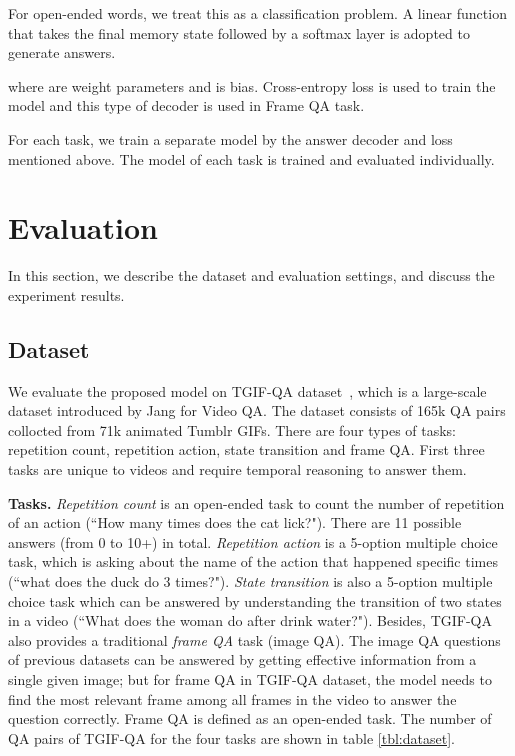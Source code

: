 \documentclass[10pt,twocolumn,letterpaper]{article}
\begin{document}
For open-ended words, we treat this as a classification problem. A linear function that takes the final memory state  followed by a softmax layer is adopted to generate answers.

where  are weight parameters and  is bias. Cross-entropy loss is used to train the model and this type of decoder is used in Frame QA task.

For each task, we train a separate model by the answer decoder and loss mentioned above. The model of each task is trained and evaluated individually.

\section{Evaluation}
\label{sec:eval}
In this section, we describe the dataset and evaluation settings, and discuss the experiment results.

\subsection{Dataset}
We evaluate the proposed model on TGIF-QA dataset~\cite{Jang_2017_CVPR}, which is a large-scale dataset introduced by Jang \etal for Video QA. The dataset consists of 165k QA pairs collocted from 71k animated Tumblr GIFs. There are four types of tasks: repetition count, repetition action, state transition and frame QA. First three tasks are unique to videos and require temporal reasoning to answer them.

\textbf{Tasks.} \textit{Repetition count} is an open-ended task to count the number of repetition of an action (\eg ``How many times does the cat
lick?"). There are 11 possible answers (\ie from 0 to 10+) in total. \textit{Repetition action} is a 5-option multiple choice task, which is asking about the name of the action that happened specific times (\eg ``what does the duck do 3 times?"). \textit{State transition} is also a 5-option multiple choice task which can be answered by understanding the transition of two states in a video (\eg ``What does the woman do after drink water?"). Besides, TGIF-QA also provides a traditional \textit{frame QA} task (\ie image QA). The image QA questions of previous datasets \cite{Antol_2015_ICCV, ren2015exploring, malinowski2014multi} can be answered by getting effective information from a single given image; but for frame QA in TGIF-QA dataset, the model needs to find the most relevant frame among all frames in the video to answer the question correctly. Frame QA is defined as an open-ended task. The number of QA pairs of TGIF-QA for the four tasks are shown in table \ref{tbl:dataset}.
\end{document}

